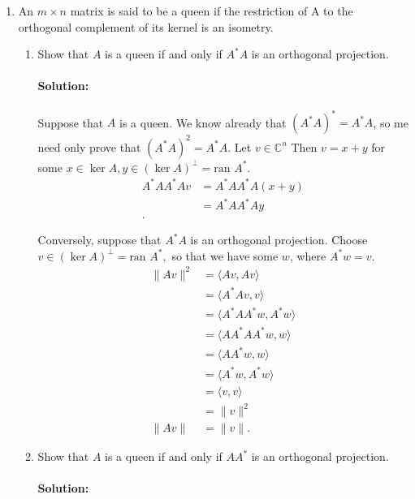 \documentclass{article}
\begin{document}
\begin{enumerate} 

\item An $m \times n$ matrix is said to be a queen if the restriction of A to the orthogonal complement of its kernel is an isometry.

\begin{enumerate}[label= (\alph*)] 
\item Show that $A$ is a queen if and only if $A^* A$ is an orthogonal projection.
    \paragraph{Solution: }
Suppose that $A$ is a queen. We know already that $(A^* A)^* =A^* A$, so me need only prove that $(A^* A)^2=A^* A$. Let $v\in \mathbb{C}^{n}$ Then $v=x+y$ for some $x\in \ker A,y\in (\ker A)^{\perp}=\text{ran }A^* $.
    \begin{align*}
        A^* A A^* A v &=A^* A A^* A (x+y)\\
        &=A^* A A^* A y\\
    .\end{align*}%

    Conversely, suppose that $A^* A$ is an orthogonal projection. Choose $v\in (\ker A)^{\perp}=\text{ran }A^{*},$ so that we have some $w$, where  $A^* w=v$.
    \begin{align*}
        \|Av\|^2&=\langle Av,Av \rangle\\
                &=\langle A^* Av,v \rangle\\
                &=\langle A^* A A^* w,A^* w \rangle\\
                &=\langle AA^* A A^* w, w \rangle\\
                &=\langle AA^*w, w \rangle\\
                &=\langle A^*w, A^* w \rangle\\
                &=\langle v,v\rangle\\
                &= \|v\|^2 \\
        \|Av\|&=\|v\|
    .\end{align*}
\item Show that $A$ is a queen if and only if $AA^*$ is an orthogonal projection.
    \paragraph{Solution: }%


\end{enumerate}
\end{enumerate}
\end{document}
